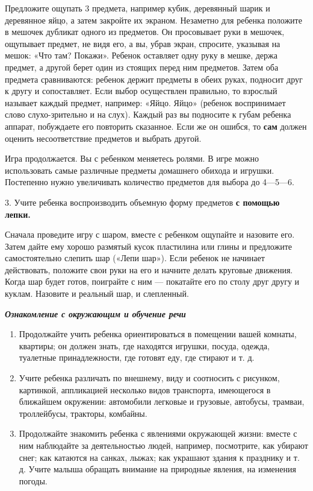 \documentclass{book}
\renewcommand{\emph}[1]{\textit{#1}}
\begin{document}
Предложите ощупать 3 предмета, например кубик, деревянный шарик и
деревянное яйцо, а затем закройте их экраном. Незаметно для ребенка
положите в мешочек дубликат одного из предметов. Он просовывает руки в
мешочек, ощупывает предмет, не видя его, а вы, убрав экран, спросите,
указывая на мешок: «Что там? Покажи». Ребенок оставляет одну руку в
мешке, держа предмет, а другой берет один из стоящих перед ним
предметов. Затем оба предмета сравниваются: ребенок держит предметы в
обеих руках, подносит друг к другу и сопоставляет. Если выбор
осуществлен правильно, то взрослый называет каждый предмет, например:
«Яйцо. Яйцо» (ребенок воспринимает слово слухо-зрительно и на слух).
Каждый раз вы подносите к губам ребенка аппарат, побуждаете его
повторить сказанное. Если же он ошибся, то \textbf{сам} должен оценить
несоответствие предметов и выбрать другой.

Игра продолжается. Вы с ребенком меняетесь ролями. В игре можно
использовать самые различные предметы домашнего обихода и игрушки.
Постепенно нужно увеличивать количество предметов для выбора до
4---5---6.

3. Учите ребенка воспроизводить объемную форму предметов \textbf{с
помощью лепки.}

Сначала проведите игру с шаром, вместе с ребенком ощупайте и назовите
его. Затем дайте ему хорошо размятый кусок пластилина или глины и
предложите самостоятельно слепить шар («Лепи шар»). Если ребенок не
начинает действовать, положите свои руки на его и начните делать
круговые движения. Когда шар будет готов, поиграйте с ним --- покатайте
его по столу друг другу и куклам. Назовите и реальный шар, и слепленный.

\emph{\textbf{Ознакомление с окружающим и обучение речи}}


\begin{enumerate}
\def\labelenumi{\arabic{enumi}.}
\item
  
  Продолжайте учить ребенка ориентироваться в помещении вашей комнаты,
  квартиры; он должен знать, где находятся игрушки, посуда, одежда,
  туалетные принадлежности, где готовят еду, где стирают и т. д.
  
\item
  
  Учите ребенка различать по внешнему, виду и соотносить с рисунком,
  картинкой, аппликацией несколько видов транспорта, имеющегося в
  ближайшем окружении: автомобили легковые и грузовые, автобусы,
  трамваи, троллейбусы, тракторы, комбайны.
  
\item
  
  Продолжайте знакомить ребенка с явлениями окружающей жизни: вместе с
  ним наблюдайте за деятельностью людей, например, посмотрите, как
  убирают снег; как катаются на санках, лыжах; как украшают здания к
  празднику и т. д. Учите малыша обращать внимание на природные явления,
  на изменения погоды.
  
\end{enumerate}
\end{document}
